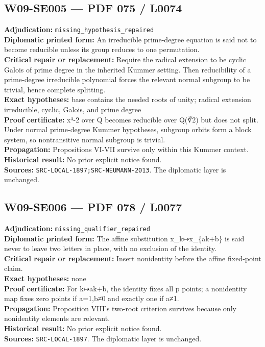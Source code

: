 \documentclass[
  10pt,
  a4paper,
]{scrreprt}
\begin{document}
\subsection{W09-SE005 --- PDF 075 /
L0074}\label{w09-se005-pdf-075-l0074}

\textbf{Adjudication:} \texttt{missing\_hypothesis\_repaired}\\
\textbf{Diplomatic printed form:} An irreducible prime-degree equation
is said not to become reducible unless its group reduces to one
permutation.\\
\textbf{Critical repair or replacement:} Require the radical extension
to be cyclic Galois of prime degree in the inherited Kummer setting.
Then reducibility of a prime-degree irreducible polynomial forces the
relevant normal subgroup to be trivial, hence complete splitting.\\
\textbf{Exact hypotheses:} base contains the needed roots of unity;
radical extension irreducible, cyclic, Galois, and prime degree\\
\textbf{Proof certificate:} x³-2 over Q becomes reducible over Q(∛2) but
does not split. Under normal prime-degree Kummer hypotheses, subgroup
orbits form a block system, so nontransitive normal subgroup is
trivial.\\
\textbf{Propagation:} Propositions VI-VII survive only within this
Kummer context.\\
\textbf{Historical result:} No prior explicit notice found.\\
\textbf{Sources:} \texttt{SRC-LOCAL-1897;SRC-NEUMANN-2013}. The
diplomatic layer is unchanged.

\subsection{W09-SE006 --- PDF 078 /
L0077}\label{w09-se006-pdf-078-l0077}

\textbf{Adjudication:} \texttt{missing\_qualifier\_repaired}\\
\textbf{Diplomatic printed form:} The affine substitution
x\_k↦x\_\{ak+b\} is said never to leave two letters in place, with no
exclusion of the identity.\\
\textbf{Critical repair or replacement:} Insert nonidentity before the
affine fixed-point claim.\\
\textbf{Exact hypotheses:} none\\
\textbf{Proof certificate:} For k↦ak+b, the identity fixes all p points;
a nonidentity map fixes zero points if a=1,b≠0 and exactly one if a≠1.\\
\textbf{Propagation:} Proposition VIII's two-root criterion survives
because only nonidentity elements are relevant.\\
\textbf{Historical result:} No prior explicit notice found.\\
\textbf{Sources:} \texttt{SRC-LOCAL-1897}. The diplomatic layer is
unchanged.
\end{document}
